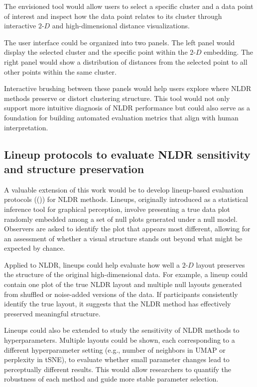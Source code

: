 \documentclass[
  11pt,
  a4paper,
]{report}
\begin{document}
The envisioned tool would allow users to select a specific cluster and a
data point of interest and inspect how the data point relates to its
cluster through interactive \(2\text{-}D\) and high-dimensional distance
visualizations.

The user interface could be organized into two panels. The left panel
would display the selected cluster and the specific point within the
\(2\text{-}D\) embedding. The right panel would show a distribution of
distances from the selected point to all other points within the same
cluster.

Interactive brushing between these panels would help users explore where
NLDR methods preserve or distort clustering structure. This tool would
not only support more intuitive diagnosis of NLDR performance but could
also serve as a foundation for building automated evaluation metrics
that align with human interpretation.

\subsection{Lineup protocols to evaluate NLDR sensitivity and structure
preservation}\label{lineup-protocols-to-evaluate-nldr-sensitivity-and-structure-preservation}

A valuable extension of this work would be to develop lineup-based
evaluation protocols
(()) for NLDR methods.
Lineups, originally introduced as a statistical inference tool for
graphical perception, involve presenting a true data plot randomly
embedded among a set of null plots generated under a null model.
Observers are asked to identify the plot that appears most different,
allowing for an assessment of whether a visual structure stands out
beyond what might be expected by chance.

Applied to NLDR, lineups could help evaluate how well a \(2\text{-}D\)
layout preserves the structure of the original high-dimensional data.
For example, a lineup could contain one plot of the true NLDR layout and
multiple null layouts generated from shuffled or noise-added versions of
the data. If participants consistently identify the true layout, it
suggests that the NLDR method has effectively preserved meaningful
structure.

Lineups could also be extended to study the sensitivity of NLDR methods
to hyperparameters. Multiple layouts could be shown, each corresponding
to a different hyperparameter setting (e.g., number of neighbors in UMAP
or perplexity in tSNE), to evaluate whether small parameter changes lead
to perceptually different results. This would allow researchers to
quantify the robustness of each method and guide more stable parameter
selection.
\end{document}
